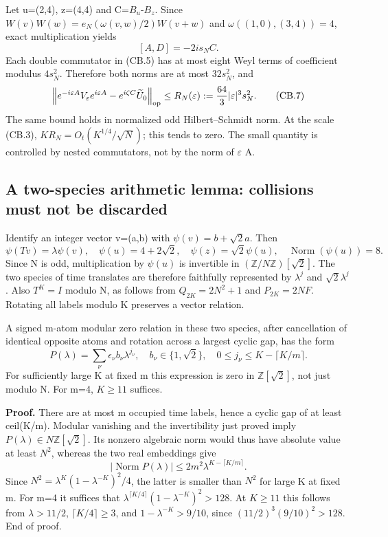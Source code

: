 Let u=(2,4), z=(4,4) and C=\(B_{u}\)-\(B_{z}\). Since \(W(v)W(w)=e_N(\omega(v,w)/2)W(v+w)\) and \(\omega((1,0),(3,4))=4\), exact multiplication yields \[
 [A,D]=-2i s_N C.                                             \tag{CB.6}
\] Each double commutator in (CB.5) has at most eight Weyl terms of coefficient modulus \(4s_N^2\). Therefore both norms are at most \(32s_N^2\), and \[
 \left\|e^{-i\varepsilon A}V_\varepsilon e^{i\varepsilon A}
                  -e^{i\zeta C}\widetilde U_0\right\|_{\rm op}
 \leq R_N(\varepsilon):=\frac{64}{3}|\varepsilon|^3s_N^2.        \tag{CB.7}
\] The same bound holds in normalized odd Hilbert--Schmidt norm. At the scale (CB.3), \(KR_N=O_t(K^{1/4}/\sqrt N)\); this tends to zero. The small quantity is controlled by nested commutators, not by the norm of \(\varepsilon\) A.

\subsection{A two-species arithmetic lemma: collisions must not be discarded}\label{coboundary:a-two-species-arithmetic-lemma-collisions-must-not-be-discarded}

Identify an integer vector v=(a,b) with \(\psi(v)=b+\sqrt2 a\). Then \[
 \psi(Tv)=\lambda\psi(v),\quad
 \psi(u)=4+2\sqrt2,\quad \psi(z)=\sqrt2\psi(u),\quad
 \operatorname{Norm}(\psi(u))=8.
\] Since N is odd, multiplication by \(\psi(u)\) is invertible in \((\mathbb Z/N\mathbb Z)[\sqrt2]\). The two species of time translates are therefore faithfully represented by \(\lambda^j\) and \(\sqrt2\lambda^j\). Also \(T^K=I\) modulo N, as follows from \(Q_{2K}=2N^2+1\) and \(P_{2K}=2NF\). Rotating all labels modulo K preserves a vector relation.

\begin{lemma}[lifting]\label{pass1:ch07_coboundary_resonance-4} A signed m-atom modular zero relation in these two species, after cancellation of identical opposite atoms and rotation across a largest cyclic gap, has the form \[
 P(\lambda)=\sum_\nu \epsilon_\nu b_\nu\lambda^{j_\nu},
 \quad b_\nu\in\{1,\sqrt2\},\quad
 0\leq j_\nu\leq K-\lceil K/m\rceil.
\] For sufficiently large K at fixed m this expression is zero in \(\mathbb Z[\sqrt2]\), not just modulo N. For m=4, \(K\geq11\) suffices.
\end{lemma}

\textbf{Proof.} There are at most m occupied time labels, hence a cyclic gap of at least ceil(K/m). Modular vanishing and the invertibility just proved imply \(P(\lambda)\in N\mathbb Z[\sqrt2]\). Its nonzero algebraic norm would thus have absolute value at least \(N^2\), whereas the two real embeddings give \[
 |\operatorname{Norm}P(\lambda)|
 \leq2m^2\lambda^{K-\lceil K/m\rceil}.
\] Since \(N^2=\lambda^K(1-\lambda^{-K})^2/4\), the latter is smaller than \(N^2\) for large K at fixed m. For m=4 it suffices that \(\lambda^{\lceil K/4\rceil}(1-\lambda^{-K})^2>128\). At \(K\geq11\) this follows from \(\lambda>11/2\), \(\lceil K/4\rceil\geq3\), and \(1-\lambda^{-K}>9/10\), since \((11/2)^3(9/10)^2>128\). End of proof.

